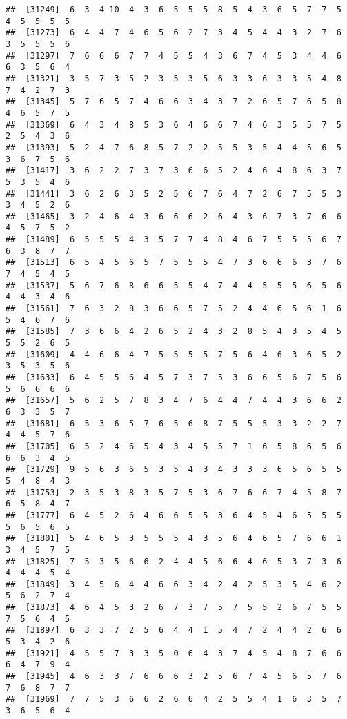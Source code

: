 \documentclass[
]{book}
\begin{document}
\begin{verbatim}
##  [31249]  6  3  4 10  4  3  6  5  5  5  8  5  4  3  6  5  7  7  5  4  5  5  5  5
##  [31273]  6  4  4  7  4  6  5  6  2  7  3  4  5  4  4  3  2  7  6  3  5  5  5  6
##  [31297]  7  6  6  6  7  7  4  5  5  4  3  6  7  4  5  3  4  4  6  6  3  5  6  4
##  [31321]  3  5  7  3  5  2  3  5  3  5  6  3  3  6  3  3  5  4  8  7  4  2  7  3
##  [31345]  5  7  6  5  7  4  6  6  3  4  3  7  2  6  5  7  6  5  8  4  6  5  7  5
##  [31369]  6  4  3  4  8  5  3  6  4  6  6  7  4  6  3  5  5  7  5  2  5  4  3  6
##  [31393]  5  2  4  7  6  8  5  7  2  2  5  5  3  5  4  4  5  6  5  3  6  7  5  6
##  [31417]  3  6  2  2  7  3  7  3  6  6  5  2  4  6  4  8  6  3  7  5  3  5  4  6
##  [31441]  3  6  2  6  3  5  2  5  6  7  6  4  7  2  6  7  5  5  3  3  4  5  2  6
##  [31465]  3  2  4  6  4  3  6  6  6  2  6  4  3  6  7  3  7  6  6  4  5  7  5  2
##  [31489]  6  5  5  5  4  3  5  7  7  4  8  4  6  7  5  5  5  6  7  6  3  8  7  7
##  [31513]  6  5  4  5  6  5  7  5  5  5  4  7  3  6  6  6  3  7  6  7  4  5  4  5
##  [31537]  5  6  7  6  8  6  6  5  5  4  7  4  4  5  5  5  6  5  6  4  4  3  4  6
##  [31561]  7  6  3  2  8  3  6  6  5  7  5  2  4  4  6  5  6  1  6  5  4  6  7  6
##  [31585]  7  3  6  6  4  2  6  5  2  4  3  2  8  5  4  3  5  4  5  5  5  2  6  5
##  [31609]  4  4  6  6  4  7  5  5  5  5  7  5  6  4  6  3  6  5  2  3  5  3  5  6
##  [31633]  6  4  5  5  6  4  5  7  3  7  5  3  6  6  5  6  7  5  6  5  6  6  6  6
##  [31657]  5  6  2  5  7  8  3  4  7  6  4  4  7  4  4  3  6  6  2  6  3  3  5  7
##  [31681]  6  5  3  6  5  7  6  5  6  8  7  5  5  5  3  3  2  2  7  4  4  5  7  6
##  [31705]  6  5  2  4  6  5  4  3  4  5  5  7  1  6  5  8  6  5  6  6  6  3  4  5
##  [31729]  9  5  6  3  6  5  3  5  4  3  4  3  3  3  6  5  6  5  5  5  4  8  4  3
##  [31753]  2  3  5  3  8  3  5  7  5  3  6  7  6  6  7  4  5  8  7  6  5  8  4  7
##  [31777]  6  4  5  2  6  4  6  6  5  5  3  6  4  5  4  6  5  5  5  5  6  5  6  5
##  [31801]  5  4  6  5  3  5  5  5  4  3  5  6  4  6  5  7  6  6  1  3  4  5  7  5
##  [31825]  7  5  3  5  6  6  2  4  4  5  6  6  4  6  5  3  7  3  6  4  4  4  5  4
##  [31849]  3  4  5  6  4  4  6  6  3  4  2  4  2  5  3  5  4  6  2  5  6  2  7  4
##  [31873]  4  6  4  5  3  2  6  7  3  7  5  7  5  5  2  6  7  5  5  7  5  6  4  5
##  [31897]  6  3  3  7  2  5  6  4  4  1  5  4  7  2  4  4  2  6  6  5  3  4  2  6
##  [31921]  4  5  5  7  3  3  5  0  6  4  3  7  4  5  4  8  7  6  6  6  4  7  9  4
##  [31945]  4  6  3  3  7  6  6  6  3  2  5  6  7  4  5  6  5  7  6  7  6  8  7  7
##  [31969]  7  7  5  3  6  6  2  6  6  4  2  5  5  4  1  6  3  5  7  3  6  5  6  4

\end{verbatim}
\end{document}

